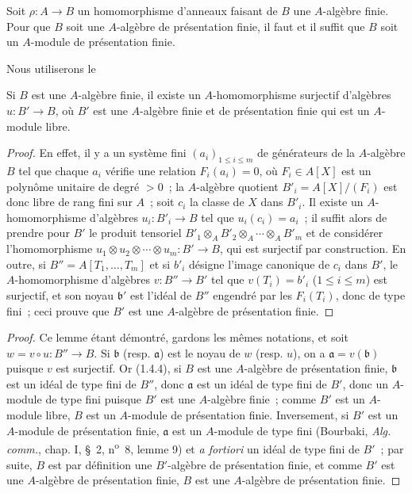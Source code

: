 \begin{proposition}[1.4.7]
\label{IV.1.4.7-fr}
Soit $\rho:A\to B$ un homomorphisme d'anneaux faisant de $B$ une $A$-algèbre
finie. Pour que $B$ soit une $A$-algèbre de présentation finie, il faut et il
suffit que $B$ soit un $A$-module de présentation finie.
\end{proposition}

Nous utiliserons le

\begin{lemma}[1.4.7.1]
\label{IV.1.4.7.1-fr}
Si $B$ est une $A$-algèbre finie, il existe un $A$-homomorphisme surjectif
d'algèbres $u:B'\to B$, où $B'$ est une $A$-algèbre finie et de présentation
finie qui est un $A$-module libre.
\end{lemma}

\begin{proof}
En effet, il y a un système fini $(a_i)_{1\leq i\leq m}$ de générateurs de la
$A$-algèbre $B$ tel que chaque $a_i$ vérifie une relation $F_i(a_i)=0$, où
$F_i\in A[X]$ est un polynôme unitaire de degré $>0$~; la $A$-algèbre quotient
$B'_i=A[X]/(F_i)$ est donc libre de rang fini sur $A$~; soit $c_i$ la classe de
$X$ dans $B'_i$. Il existe un $A$-homomorphisme d'algèbres $u_i:B'_i\to B$
tel que $u_i(c_i)=a_i$~; il suffit alors de prendre pour $B'$ le produit
tensoriel $B'_1\otimes_AB'_2\otimes_A\cdots\otimes_AB'_m$ et de considérer
l'homomorphisme $u_1\otimes u_2\otimes\cdots\otimes u_m:B'\to B$, qui est
surjectif par construction. En outre, si $B''=A[T_1,\ldots,T_m]$ et si $b'_i$
désigne l'image canonique de $c_i$ dans $B'$, le $A$-homomorphisme d'algèbres
$v:B''\to B'$ tel que $v(T_i)=b'_i$ ($1\leq i\leq m$) est surjectif, et son
noyau $\mathfrak b'$ est l'idéal de $B''$ engendré par les $F_i(T_i)$, donc de
type fini~; ceci prouve que $B'$ est une $A$-algèbre de présentation finie.
\end{proof}

\begin{proof}
Ce lemme étant démontré, gardons les mêmes notations, et soit
$w=v\circ u:B''\to B$. Si $\mathfrak b$ (resp. $\mathfrak a$) est le noyau de
$w$ (resp. $u$), on a $\mathfrak a=v(\mathfrak b)$ puisque $v$ est surjectif.
Or (1.4.4), si $B$ est une $A$-algèbre de présentation finie, $\mathfrak b$
est un idéal de type fini de $B''$, donc $\mathfrak a$ est un idéal de type
fini de $B'$, donc un $A$-module de type fini puisque $B'$ est une $A$-algèbre
finie~; comme $B'$ est un $A$-module libre, $B$ est un $A$-module de
présentation finie. Inversement, si $B'$ est un $A$-module de présentation
finie, $\mathfrak a$ est un $A$-module de type fini (Bourbaki,
\emph{Alg. comm.}, chap. I, \S~2, n\textsuperscript{o}~8, lemme 9) et
\emph{a fortiori} un idéal de type fini de $B'$~; par suite, $B$ est par
définition une $B'$-algèbre de présentation finie, et comme $B'$ est une
$A$-algèbre de présentation finie, $B$ est une $A$-algèbre de présentation
finie.
\end{proof}

